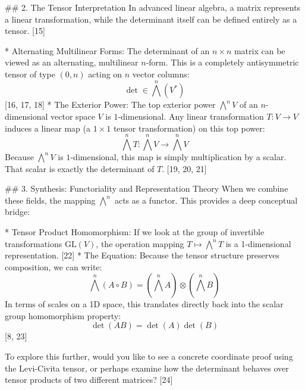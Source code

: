 ## 2. The Tensor Interpretation
In advanced linear algebra, a matrix represents a linear transformation, while the determinant itself can be defined entirely as a tensor. [15] 

* Alternating Multilinear Forms: The determinant of an $n \times n$ matrix can be viewed as an alternating, multilinear $n$-form. This is a completely antisymmetric tensor of type $(0, n)$ acting on $n$ vector columns:
$$\det \in \bigwedge^n(V^*)$$ [16, 17, 18] 
* The Exterior Power: The top exterior power $\bigwedge^n V$ of an $n$-dimensional vector space $V$ is $1$-dimensional. Any linear transformation $T: V \to V$ induces a linear map (a $1 \times 1$ tensor transformation) on this top power:
$$\bigwedge^n T: \bigwedge^n V \to \bigwedge^n V$$ 
Because $\bigwedge^n V$ is $1$-dimensional, this map is simply multiplication by a scalar. That scalar is exactly the determinant of $T$. [19, 20, 21] 

## 3. Synthesis: Functoriality and Representation Theory
When we combine these fields, the mapping $\bigwedge^n$ acts as a functor. This provides a deep conceptual bridge:

* Tensor Product Homomorphism: If we look at the group of invertible transformations $\text{GL}(V)$, the operation mapping $T \mapsto \bigwedge^n T$ is a 1-dimensional representation. [22] 
* The Equation: Because the tensor structure preserves composition, we can write:
$$\bigwedge^n (A \circ B) = \left(\bigwedge^n A\right) \otimes \left(\bigwedge^n B\right)$$ 
In terms of scales on a 1D space, this translates directly back into the scalar group homomorphism property:
$$\det(AB) = \det(A)\det(B)$$ [8, 23] 

To explore this further, would you like to see a concrete coordinate proof using the Levi-Civita tensor, or perhaps examine how the determinant behaves over tensor products of two different matrices? [24] 

